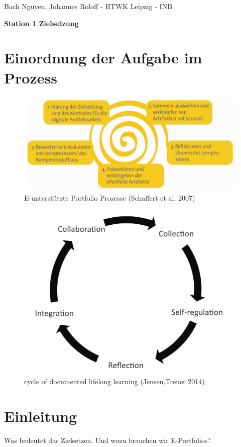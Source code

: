 \documentclass[a4paper,oneside]{scrarticle}
\begin{document}
	\begin{flushleft}
		Bach Nguyen, Johannes Roloff - HTWK Leipzig - INB
	\end{flushleft}
	\begin{center}
		\begin{LARGE}
			\textbf{Station 1 Zielsetzung}
		\end{LARGE}
	\end{center}
	\section*{Einordnung der Aufgabe im Prozess}
	\begin{figure} [h]
		\centering
		\includegraphics[width=0.7\linewidth]{e-portfolio-prozesse-schaffert}
		\caption{E-unterstützte Portfolio Prozesse (Schaffert et al. 2007)}
		\label{fig:e-portfolio-prozesse-schaffert}
	\end{figure}
	\begin{figure}[h]
		\centering
		\includegraphics[width=0.7\linewidth]{cycle-of-documented-lifelong-learning-Jensen}
		\caption{cycle of documented lifelong learning (Jensen,Treuer 2014)}
		\label{fig:cycle-of-documented-lifelong-learning-jensen}
	\end{figure}
	\pagebreak 
	
	\section*{Einleitung}
	Was bedeutet das Zielsetzen. Und wozu brauchen wir E-Portfolios?
	
\end{document}
